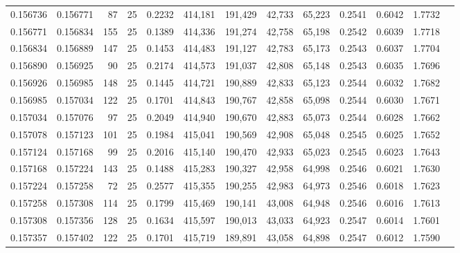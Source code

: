 \begin{tabular}{rrrrrrrrrrrrr}
0.156736 & 0.156771 &    87 &  25 &                                     0.2232 & 414,181 & 191,429 &  42,733 &  65,223 & 0.2541 & 0.6042 & 1.7732 \\
0.156771 & 0.156834 &   155 &  25 &                                     0.1389 & 414,336 & 191,274 &  42,758 &  65,198 & 0.2542 & 0.6039 & 1.7718 \\
0.156834 & 0.156889 &   147 &  25 &                                     0.1453 & 414,483 & 191,127 &  42,783 &  65,173 & 0.2543 & 0.6037 & 1.7704 \\
0.156890 & 0.156925 &    90 &  25 &                                     0.2174 & 414,573 & 191,037 &  42,808 &  65,148 & 0.2543 & 0.6035 & 1.7696 \\
0.156926 & 0.156985 &   148 &  25 &                                     0.1445 & 414,721 & 190,889 &  42,833 &  65,123 & 0.2544 & 0.6032 & 1.7682 \\
0.156985 & 0.157034 &   122 &  25 &                                     0.1701 & 414,843 & 190,767 &  42,858 &  65,098 & 0.2544 & 0.6030 & 1.7671 \\
0.157034 & 0.157076 &    97 &  25 &                                     0.2049 & 414,940 & 190,670 &  42,883 &  65,073 & 0.2544 & 0.6028 & 1.7662 \\
0.157078 & 0.157123 &   101 &  25 &                                     0.1984 & 415,041 & 190,569 &  42,908 &  65,048 & 0.2545 & 0.6025 & 1.7652 \\
0.157124 & 0.157168 &    99 &  25 &                                     0.2016 & 415,140 & 190,470 &  42,933 &  65,023 & 0.2545 & 0.6023 & 1.7643 \\
0.157168 & 0.157224 &   143 &  25 &                                     0.1488 & 415,283 & 190,327 &  42,958 &  64,998 & 0.2546 & 0.6021 & 1.7630 \\
0.157224 & 0.157258 &    72 &  25 &                                     0.2577 & 415,355 & 190,255 &  42,983 &  64,973 & 0.2546 & 0.6018 & 1.7623 \\
0.157258 & 0.157308 &   114 &  25 &                                     0.1799 & 415,469 & 190,141 &  43,008 &  64,948 & 0.2546 & 0.6016 & 1.7613 \\
0.157308 & 0.157356 &   128 &  25 &                                     0.1634 & 415,597 & 190,013 &  43,033 &  64,923 & 0.2547 & 0.6014 & 1.7601 \\
0.157357 & 0.157402 &   122 &  25 &                                     0.1701 & 415,719 & 189,891 &  43,058 &  64,898 & 0.2547 & 0.6012 & 1.7590 \\

\end{tabular}
